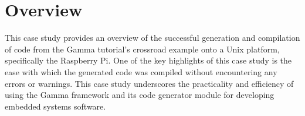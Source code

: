 \section{Overview}

This case study provides an overview of the successful generation and compilation of code from the Gamma tutorial's crossroad example onto a Unix platform, specifically the Raspberry Pi. One of the key highlights of this case study is the ease with which the generated code was compiled without encountering any errors or warnings. This case study underscores the practicality and efficiency of using the Gamma framework and its code generator module for developing embedded systems software.
